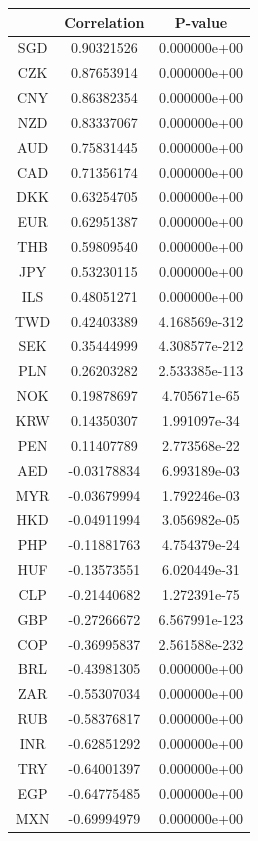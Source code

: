 \documentclass[11pt,preprint, authoryear]{elsarticle}
\let\origtable\table
\let\endorigtable\endtable
\renewenvironment{table}[1][2] {
    \expandafter\origtable\expandafter[H]
} {
    \endorigtable
}
\numberwithin{equation}{section}
\numberwithin{figure}{section}
\numberwithin{table}{section}
\begin{document}
\begin{table}
\begin{center}
\begin{tabular}{|c|c|c|} 
 \hline
 & Correlation & P-value  \\
 \hline
SGD & 0.90321526 & 0.000000e+00 \\
CZK & 0.87653914 & 0.000000e+00 \\
CNY & 0.86382354 & 0.000000e+00 \\
NZD & 0.83337067 & 0.000000e+00 \\
AUD & 0.75831445 & 0.000000e+00 \\
CAD &  0.71356174 & 0.000000e+00 \\
DKK & 0.63254705 & 0.000000e+00 \\
EUR & 0.62951387 & 0.000000e+00 \\
THB &  0.59809540 & 0.000000e+00 \\
JPY  & 0.53230115 & 0.000000e+00 \\
ILS & 0.48051271 & 0.000000e+00 \\
TWD & 0.42403389 & 4.168569e-312 \\
SEK & 0.35444999 & 4.308577e-212 \\
PLN & 0.26203282 & 2.533385e-113 \\
NOK & 0.19878697 & 4.705671e-65 \\
KRW & 0.14350307 & 1.991097e-34 \\
PEN & 0.11407789 & 2.773568e-22 \\
AED & -0.03178834 & 6.993189e-03 \\
MYR & -0.03679994 & 1.792246e-03 \\
HKD & -0.04911994 & 3.056982e-05 \\
PHP & -0.11881763 & 4.754379e-24 \\
HUF &  -0.13573551 & 6.020449e-31 \\
CLP & -0.21440682 & 1.272391e-75 \\
GBP &  -0.27266672 & 6.567991e-123 \\
COP & -0.36995837 & 2.561588e-232 \\
BRL & -0.43981305 & 0.000000e+00 \\
ZAR & -0.55307034 & 0.000000e+00 \\
RUB & -0.58376817 & 0.000000e+00 \\
INR & -0.62851292 & 0.000000e+00 \\
TRY & -0.64001397 & 0.000000e+00 \\
EGP & -0.64775485 & 0.000000e+00 \\
MXN & -0.69994979 & 0.000000e+00 \\
\hline
\end{tabular}
\caption{Correlation and P-value for the second principal component }
 \label{pca2}
\end{center}
\end{table}
\end{document}
